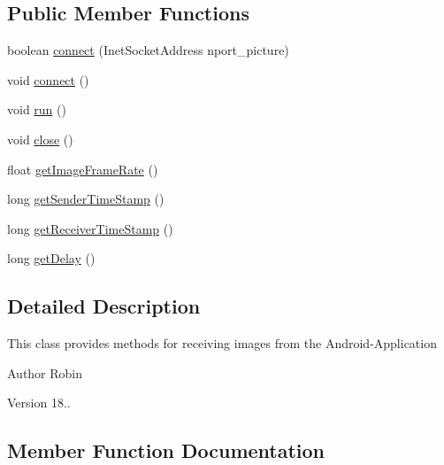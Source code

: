 \subsection*{Public Member Functions}
\begin{DoxyCompactItemize}
\item 
boolean \hyperlink{class_controller_1_1_socket___picture_ab87a7b12f3233d51c057cfb7aae5768e}{connect} (Inet\+Socket\+Address nport\+\_\+picture)
\item 
void \hyperlink{class_controller_1_1_socket___picture_aa966da35d5df22360655ecc609a223c5}{connect} ()
\item 
void \hyperlink{class_controller_1_1_socket___picture_a7dd51a154509634a49d6fe67b1da78a6}{run} ()
\item 
void \hyperlink{class_controller_1_1_socket___picture_a3dc8685eb30d00747049005e8d97f8bb}{close} ()
\item 
float \hyperlink{class_controller_1_1_socket___picture_aa561817419780ab70b915fdd063a7f36}{get\+Image\+Frame\+Rate} ()
\item 
long \hyperlink{class_controller_1_1_socket___picture_a775471efe467a2495c1cb10b28a5fea7}{get\+Sender\+Time\+Stamp} ()
\item 
long \hyperlink{class_controller_1_1_socket___picture_a397ef19448b1f677b390cb05d41d2343}{get\+Receiver\+Time\+Stamp} ()
\item 
long \hyperlink{class_controller_1_1_socket___picture_af59ea1eb18e896ad8a1521d555908248}{get\+Delay} ()
\end{DoxyCompactItemize}


\subsection{Detailed Description}
This class provides methods for receiving images from the Android-\/\+Application \begin{DoxyAuthor}{Author}
Robin 
\end{DoxyAuthor}
\begin{DoxyVersion}{Version}
18.. 
\end{DoxyVersion}


\subsection{Member Function Documentation}
\hypertarget{class_controller_1_1_socket___picture_a3dc8685eb30d00747049005e8d97f8bb}{}
